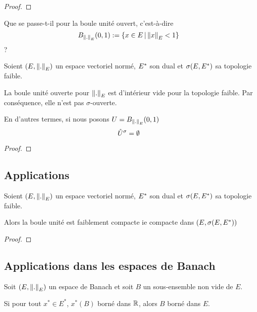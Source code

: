 \ifdefined\outputproof
\begin{proof}

\end{proof}
\fi

Que se passe-t-il pour la boule unité ouvert, c'est-à-dire
\begin{equation}
	B_{\norm{.}_{E}}(0, 1) := \left\{x \in E \, | \, \norm{x}_{E} < 1 \right\}
\end{equation}
?

\begin{proposition}
	Soient $(E, \norm{.}_{E})$ un espace vectoriel normé,
	$E^{*}$ son dual et $\sigma(E, E^{*})$ sa topologie faible.

	La boule unité ouverte pour $\norm{.}_{E}$ est d'intérieur vide pour la
	topologie faible. Par conséquence, elle n'est pas $\sigma$-ouverte.

	En d'autres termes, si nous posons $U = B_{\norm{.}_{E}}(0, 1)$
	\begin{equation}
		\mathring{U}^{\sigma} = \emptyset
	\end{equation}
\end{proposition}

\ifdefined\outputproof
\begin{proof}

\end{proof}
\fi

\subsection{Applications}

\begin{theorem}
	Soient $(E, \norm{.}_{E})$ un espace vectoriel normé,
	$E^{*}$ son dual et $\sigma(E, E^{*})$ sa topologie faible.

	Alors la boule unité est faiblement compacte ie compacte dans $(E,
	\sigma(E, E^{*}))$
\end{theorem}

\ifdefined\outputproof
\begin{proof}

\end{proof}
\fi

\subsection{Applications dans les espaces de Banach}

\begin{proposition}
	Soit $(E, \norm{.}_{E})$ un espace de Banach et soit
	$B$ un sous-ensemble non vide de $E$.

	Si pour tout $x^{*} \in E^{*}$, $x^{*}(B)$ borné dans $\mathbb{R}$, alors $B$ borné
	dans $E$.
\end{proposition}

